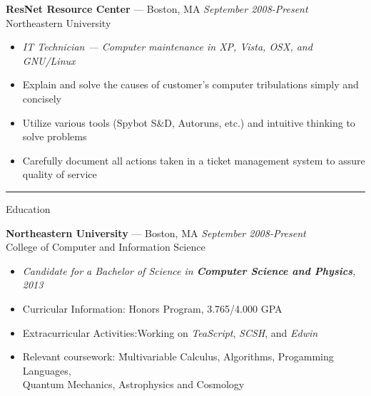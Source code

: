 \documentclass[10pt]{letter}
\begin{document}
\begin{tabbing}
{\large \bf ResNet Resource Center} --- Boston, MA \` \textit{September 2008-Present} \\
Northeastern University
\end{tabbing}\vspace{-10pt}

\begin{itemize}
\setlength\itemsep{1pt}
\item [] \textit{IT Technician --- Computer maintenance in XP, Vista, OSX, and GNU/Linux}
\item Explain and solve the causes of customer's computer tribulations simply and concisely
\item Utilize various tools (Spybot S\&D, Autoruns, etc.) and intuitive thinking to solve problems
\item Carefully document all actions taken in a ticket management system to assure quality of service
\end{itemize}
\rule{\linewidth}{.5pt}

{\Large Education}
\begin{tabbing}
{\large \bf Northeastern University} --- Boston, MA \` \textit{September 2008-Present} \\
College of Computer and Information Science
\end{tabbing}\vspace{-15pt}

\begin{itemize}
\setlength\itemsep{1pt}
\item[] \textit{Candidate for a Bachelor of Science in \textbf{Computer Science and Physics}, 2013}
\item Curricular Information:\hspace{.355in} Honors Program, 3.765/4.000 GPA
\item Extracurricular Activities:\hspace{.245in}Working on \textit{TeaScript}, \textit{SCSH}, and \textit{Edwin}
\item \begin{tabbing}Relevant coursework:\hspace{.5in} \= Multivariable Calculus, Algorithms, Progamming Languages, \\
  \>Quantum Mechanics, Astrophysics and Cosmology\end{tabbing}
\end{itemize}
\end{document}
